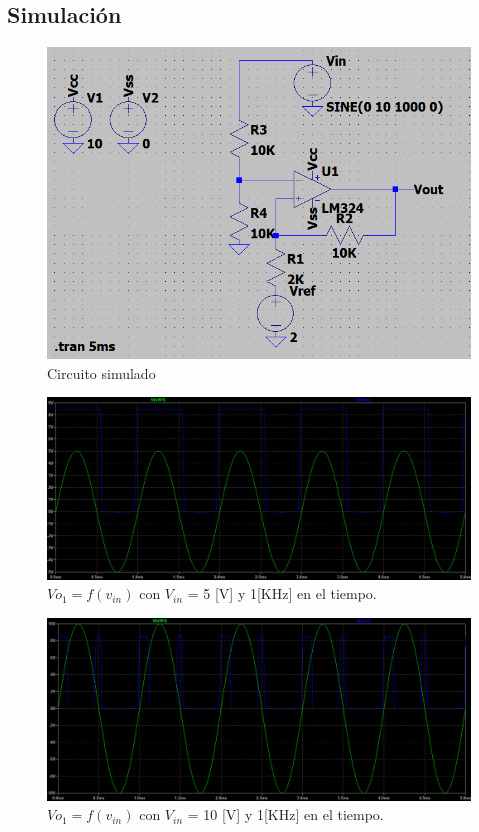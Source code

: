 \documentclass[11pt, a4paper]{article}
\begin{document}
\subsection{Simulación}
\begin{figure}[H]
	\centering
	\includegraphics[width=1\textwidth]{Imagenes/Circuito4Sim.png}
	\caption{Circuito simulado}
\end{figure}
\begin{figure}[H]
	\centering
	\includegraphics[width=1\textwidth]{Imagenes/ComparadorConHisteresis.png}
	\caption{$Vo_1= f(v_{in})$ con $V_{in}$ = 5 [V] y 1[KHz] en el tiempo.}
\end{figure}
\begin{figure}[H]
	\centering
	\includegraphics[width=1\textwidth]{Imagenes/comparadorVin10V.png}
	\caption{$Vo_1= f(v_{in})$ con $V_{in}$ = 10 [V] y 1[KHz] en el tiempo.}
\end{figure}
\end{document}
